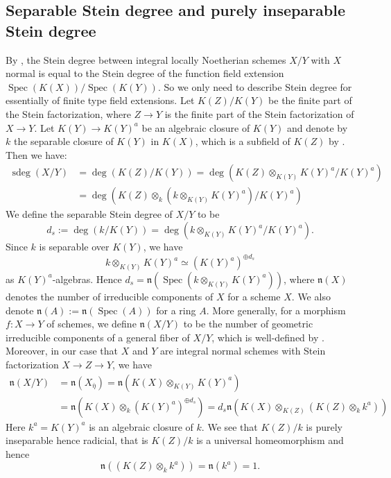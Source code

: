 \documentclass[letterpaper,reqno,12pt]{amsart}
\DeclareMathOperator{\Spec}{Spec}
\DeclareMathOperator{\sdeg}{sdeg}
\numberwithin{equation}{section}
\theoremstyle{plain}
\begin{document}
\subsection{Separable Stein degree and purely inseparable Stein degree}
By , the Stein degree between integral locally Noetherian schemes  $X/Y$ with $X$ normal is equal to the Stein degree of the function field extension $\Spec(K(X))/\Spec(K(Y))$. So we only need to describe Stein degree for essentially of finite type field extensions. Let $K(Z)/K(Y)$ be the finite part of the Stein factorization, where $Z\to Y$ is the finite part of the Stein factorization of $X\to Y$. Let $K(Y)\to K(Y)^a$ be an algebraic closure of $K(Y)$ and denote by $k$ the separable closure of $K(Y)$ in $K(X)$, which is a subfield of $K(Z)$ by . Then we have:
\[\begin{aligned}
    \sdeg(X/Y)&=\deg(K(Z)/K(Y))=\deg(K(Z)\otimes_{K(Y)} K(Y)^a/K(Y)^a)\\&=\deg(K(Z)\otimes_k(k\otimes _{K(Y)}K(Y)^a)/K(Y)^a)
\end{aligned}\]
We define the separable Stein degree of $X/Y$ to be 
\[d_s:=\deg(k/K(Y))=\deg(k\otimes_{K(Y)}K(Y)^a/K(Y)^a).\] Since $k$ is separable over $K(Y)$, we have \[k\otimes_{K(Y)}K(Y)^a\simeq (K(Y)^a)^{\oplus d_s}\] as $K(Y)^a$-algebras.%
Hence $d_s=\mathfrak n(\Spec (k\otimes_{K(Y)}K(Y)^a))$, where $\mathfrak n(X)$ denotes the number of irreducible components of $X$ for a scheme $X$. We also denote $\mathfrak n(A):=\mathfrak n(\Spec(A))$ for a ring $A$. More generally, for a morphism $f:X\to Y$ of schemes, we define $\mathfrak n(X/Y)$ to be the number of geometric irreducible components of a general fiber of $X/Y$, which is well-defined by \cite[\href{https://stacks.math.columbia.edu/tag/0BUI}{Tag 0BUI}]{stacks-project}.%
Moreover, in our case that $X$ and $Y$ are integral normal schemes with Stein factorization $X\to Z\to Y$, we have 
\[\begin{aligned}
    \mathfrak n(X/Y)&=\mathfrak n(X_{\bar \eta})=\mathfrak n(K(X)\otimes_{K(Y)}K(Y)^a)\\
    &=\mathfrak n(K(X)\otimes_k(K(Y)^a)^{\oplus d_s})=d_s\mathfrak n(K(X)\otimes_{K(Z)}(K(Z)\otimes_kk^a))\label{2.3.1}
\end{aligned}\]
Here $k^a=K(Y)^a$ is an algebraic closure of $k$. We see that $K(Z)/k$ is purely inseparable hence radicial, that is $K(Z)/k$ is a universal homeomorphism and hence \[\mathfrak n((K(Z)\otimes_kk^a))=\mathfrak n(k^a)=1.\] 
\end{document}
